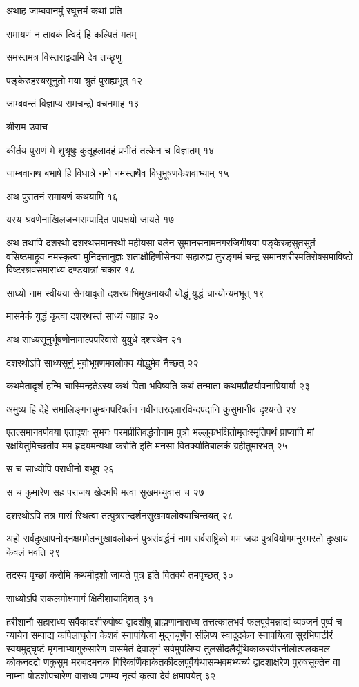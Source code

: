अथाह जाम्बवानमुं रघूत्तमं कथां प्रति

रामायणं न तावकं त्विदं हि कल्पितं मतम्

समस्तमत्र विस्तराद्वदामि देव तच्छृणु

पङ्केरुहस्यसूनुतो मया श्रुतं पुराह्यभूत् १२

जाम्बवन्तं विज्ञाप्य रामचन्द्रो वचनमाह १३

श्रीराम उवाच-

कीर्तय पुराणं मे शुश्रूषुः कुतूहलादहं प्रणीतं तत्केन च विज्ञातम् १४

जाम्बवानथ बभाषे हि विधात्रे नमो नमस्तथैव विधुभूषणकेशवाभ्याम् १५

अथ पुरातनं रामायणं कथयामि १६

यस्य श्रवणेनाखिलजन्मसम्पादित पापक्षयो जायते १७

अथ तथापि दशरथो दशरथसमानरथी महीयसा बलेन सुमानसनामनगरजिगीषया पङ्केरुहसुतसुतं
वसिष्ठमाहूय नमस्कृत्वा मुनिदत्तानुज्ञः शताक्षौहिणीसेनया सहारुह्य तुरङ्गमं चन्द्र
समानशरीरमतिरोषसमाविष्टो विष्टरश्रवसमाराध्य दण्डयात्रां चकार १८

साध्यो नाम स्वीयया सेनयावृतो दशरथाभिमुखमाययौ योद्धुं युद्धं चान्योन्यमभूत् १९

मासमेकं युद्धं कृत्वा दशरथस्तं साध्यं जग्राह २०

अथ साध्यसूनुर्भूषणोनामाल्पपरिवारो युयुधे दशरथेन २१

दशरथोऽपि साध्यसूनुं भुवोभूषणमवलोक्य योद्धुमेव नैच्छत् २२

कथमेतादृशं हन्मि चास्मिन्हतेऽस्य कथं पिता भविष्यति कथं तन्माता कथमप्रौढयौवनाप्रियार्या
 २३

अमुष्य हि देहे समालिङ्गनचुम्बनपरिवर्तन नवीनतरदलारविन्दपदानि कुसुमानीव दृश्यन्ते २४

एतत्समानवर्णवया एतादृशः सुभगः परमप्रीतिवर्द्धनोनाम पुत्रो भल्लूकभक्षितोमृतःस्मृतिपथं
प्राप्यापि मां रक्षयितुमिच्छतीव मम हृदयमन्यथा करोति इति मनसा वितर्क्यातिबालकं
ग्रहीतुमारभत् २५

स च साध्योपि पराधीनो बभूव २६

स च कुमारेण सह पराजय खेदमपि मत्वा सुखमध्युवास च २७

दशरथोऽपि तत्र मासं स्थित्वा तत्पुत्रसन्दर्शनसुखमवलोक्याचिन्तयत् २८

अहो सर्वदुःखापनोदनक्षममेतन्मुखावलोकनं पुत्रसंवर्द्धनं नाम सर्वराष्ट्रिको मम जयः
पुत्रवियोगमनुस्मरतो दुःखाय केवलं भवति २९

तदस्य पृच्छां करोमि कथमीदृशो जायते पुत्र इति वितर्क्य तमपृच्छत् ३०

साध्योऽपि सकलमोक्षमार्गं क्षितीशायादिशत् ३१

हरीशानौ सहाराध्य सर्वैकादशीरुपोष्य द्वादशीषु ब्राह्मणानाराध्य तत्तत्कालभवं
फलपूर्वमन्नाद्यं व्यञ्जनं पुष्पं च न्यायेन सम्पाद्य कपिलाघृतेन केशवं स्नापयित्वा मुद्गचूर्णेन संलिप्य
स्वादूदकेन स्नापयित्वा सुरभिपाटीरं स्वयमुद्घृष्टं मृगनाभ्यागुरुसारेण वासमेतं देवाङ्गं सर्वमुपलिप्य
तुलसीदलैर्यूथिकाकरवीरनीलोत्पलकमल कोकनदद्रो णकुसुम मरुवदमनक
गिरिकर्णिकाकेतकीदलपूर्वैर्यथासम्भवमभ्यर्च्य द्वादशाक्षरेण पुरुषसूक्तेन वा नाम्ना षोडशोपचारेण
वाराध्य प्रणम्य नृत्यं कृत्वा देवं क्षमापयेत् ३२

